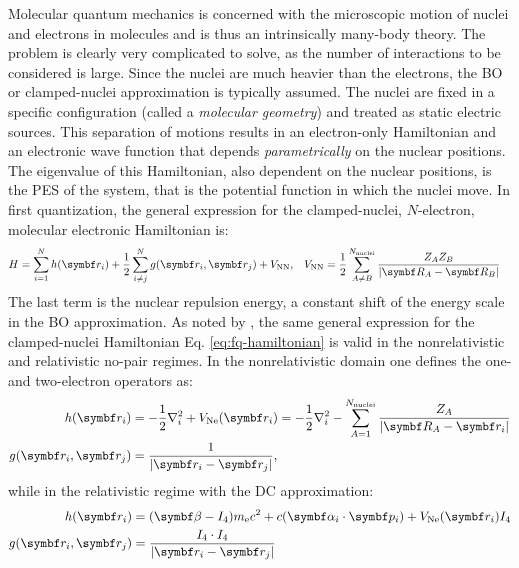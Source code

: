 Molecular quantum mechanics is concerned with the microscopic motion of
nuclei and electrons in molecules and is thus an intrinsically many-body
theory. The problem is clearly very complicated to solve, as the number of
interactions to be considered is large.
Since the nuclei are much heavier than the electrons, the \gls{BO} or
clamped-nuclei approximation is typically assumed. The nuclei are fixed
in a specific configuration (called a \emph{molecular geometry}) and
treated as static electric sources.\autocite{Born1927-ce}
This separation of motions results in an electron-only Hamiltonian and
an electronic wave function that depends \emph{parametrically} on the
nuclear positions. The eigenvalue of this Hamiltonian, also dependent on
the nuclear positions, is the \gls{PES} of the system, that is the
potential function in which the nuclei move.\autocite{Szabo1989-vl,
McWeeny1992-oj}
In first quantization, the general expression for the clamped-nuclei,
$N$-electron, molecular electronic Hamiltonian is:
\begin{alignat}{2}\label{eq:fq-hamiltonian}
  H = \sum_{i=1}^N h(\vect{r}_i)
  + \frac{1}{2}\sum_{i\neq j}^N g(\vect{r}_i, \vect{r}_j)
  + V_\mathrm{NN},
  \quad&
  V_\mathrm{NN} =
  \frac{1}{2}\sum_{A \neq B}^{N_\mathrm{nuclei}}\frac{Z_A Z_B}{|\vect{R}_A - \vect{R}_B|}
\end{alignat}
The last term is the nuclear repulsion energy, a constant shift of the
energy scale in the \acrshort{BO} approximation.
As noted by \citeauthor{Saue2011-qg}, the same general expression for
the clamped-nuclei Hamiltonian Eq. \eqref{eq:fq-hamiltonian} is valid in
the nonrelativistic and relativistic no-pair
regimes.\autocite{Sucher1980-vf, Saue2011-qg}
In the nonrelativistic domain one defines the one- and two-electron
operators as:\autocite{Szabo1989-vl, McWeeny1992-oj, Konishi2009-zb}
\begin{subequations}
 \begin{align}
   h(\vect{r}_i) &=
   -\frac{1}{2}\nabla^2_i + V_\mathrm{Ne}(\vect{r}_i)
   = -\frac{1}{2}\nabla^2_i - \sum_{A=1}^{N_\mathrm{nuclei}}\frac{Z_A}{|\vect{R}_A -
   \vect{r}_i|} \label{eq:h} \\
   g(\vect{r}_i, \vect{r}_j) &= \frac{1}{|\vect{r}_i - \vect{r}_j|},
   \label{eq:g-coulomb}
 \end{align}
\end{subequations}
while in the relativistic regime with the \gls{DC}
approximation:\autocite{Dyall2007-tu, Konishi2009-zb, Reiher2014-cp}
\begin{subequations}
 \begin{align}
   h(\vect{r}_i) &= (\mat{\beta} - I_4)\si{\electronmass}c^2 +
   c(\mat{\alpha}_i\cdot\vect{p}_i) + V_{\mathrm{Ne}}(\vect{r}_i)I_4 \\
   g(\vect{r}_i, \vect{r}_j) &= \frac{I_4\cdot I_4}{|\vect{r}_i - \vect{r}_j|}
   \label{eq:g-r-coulomb}
 \end{align}
\end{subequations}
